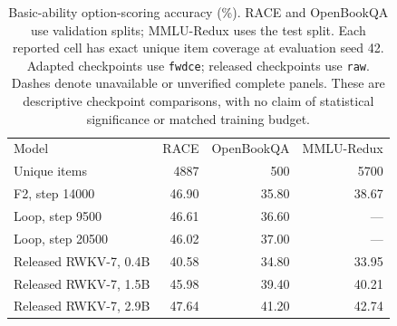 \begin{table}[t]
\centering
\small
\begin{tabular}{lrrr}
\toprule
Model & RACE & OpenBookQA & MMLU-Redux \\
Unique items & 4887 & 500 & 5700 \\
\midrule
F2, step 14000 & 46.90 & 35.80 & 38.67 \\
Loop, step 9500 & 46.61 & 36.60 & --- \\
Loop, step 20500 & 46.02 & 37.00 & --- \\
Released RWKV-7, 0.4B & 40.58 & 34.80 & 33.95 \\
Released RWKV-7, 1.5B & 45.98 & 39.40 & 40.21 \\
Released RWKV-7, 2.9B & 47.64 & 41.20 & 42.74 \\
\bottomrule
\end{tabular}
\caption{Basic-ability option-scoring accuracy (\%). RACE and OpenBookQA use validation splits; MMLU-Redux uses the test split. Each reported cell has exact unique item coverage at evaluation seed 42. Adapted checkpoints use \texttt{fwdce}; released checkpoints use \texttt{raw}. Dashes denote unavailable or unverified complete panels. These are descriptive checkpoint comparisons, with no claim of statistical significance or matched training budget.}
\label{tab:basic-ability-panels}
\end{table}
